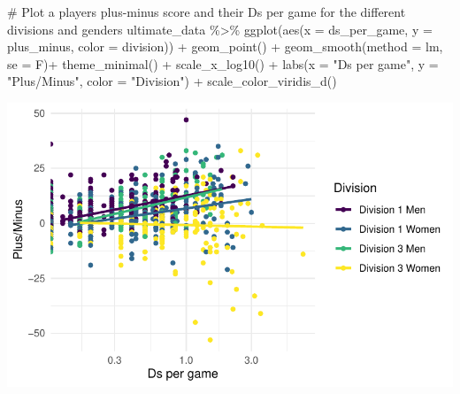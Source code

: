 \documentclass[
  letterpaper,
  DIV=11,
  numbers=noendperiod]{scrartcl}
\newenvironment{Shaded}{\begin{snugshade}}{\end{snugshade}}
\newcommand{\AttributeTok}[1]{\textcolor[rgb]{0.40,0.45,0.13}{#1}}
\newcommand{\CommentTok}[1]{\textcolor[rgb]{0.37,0.37,0.37}{#1}}
\newcommand{\FunctionTok}[1]{\textcolor[rgb]{0.28,0.35,0.67}{#1}}
\newcommand{\NormalTok}[1]{\textcolor[rgb]{0.00,0.23,0.31}{#1}}
\newcommand{\SpecialCharTok}[1]{\textcolor[rgb]{0.37,0.37,0.37}{#1}}
\newcommand{\StringTok}[1]{\textcolor[rgb]{0.13,0.47,0.30}{#1}}
\begin{document}
\begin{Shaded}
\begin{Highlighting}[]
\CommentTok{\# Plot a player\textquotesingle{}s plus{-}minus score and their D\textquotesingle{}s per game for the different divisions and genders}
\NormalTok{ultimate\_data }\SpecialCharTok{\%\textgreater{}\%} \FunctionTok{ggplot}\NormalTok{(}\FunctionTok{aes}\NormalTok{(}\AttributeTok{x =}\NormalTok{ ds\_per\_game, }\AttributeTok{y =}\NormalTok{ plus\_minus, }\AttributeTok{color =}\NormalTok{ division)) }\SpecialCharTok{+} 
   \FunctionTok{geom\_point}\NormalTok{() }\SpecialCharTok{+} \FunctionTok{geom\_smooth}\NormalTok{(}\AttributeTok{method =} \StringTok{\textquotesingle{}lm\textquotesingle{}}\NormalTok{, }\AttributeTok{se =}\NormalTok{ F)}\SpecialCharTok{+}
  \FunctionTok{theme\_minimal}\NormalTok{() }\SpecialCharTok{+} \FunctionTok{scale\_x\_log10}\NormalTok{() }\SpecialCharTok{+} 
  \FunctionTok{labs}\NormalTok{(}\AttributeTok{x =} \StringTok{"Ds per game"}\NormalTok{, }\AttributeTok{y =} \StringTok{"Plus/Minus"}\NormalTok{, }\AttributeTok{color =} \StringTok{"Division"}\NormalTok{) }\SpecialCharTok{+}
  \FunctionTok{scale\_color\_viridis\_d}\NormalTok{()}
\end{Highlighting}
\end{Shaded}

\includegraphics{final_eda_files/figure-pdf/plus-minus-&-other-variable-2.pdf}
\end{document}
